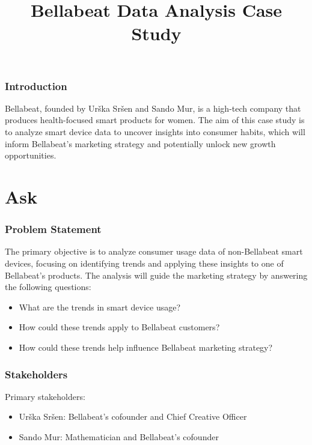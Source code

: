 \documentclass[
]{article}
\title{Bellabeat Data Analysis Case Study}
\author{}
\date{\vspace{-2.5em}}
\providecommand{\tightlist}{%
  \setlength{\itemsep}{0pt}\setlength{\parskip}{0pt}}
\begin{document}
\maketitle

\hypertarget{introduction}{%
\subsubsection{Introduction}\label{introduction}}

Bellabeat, founded by Urška Sršen and Sando Mur, is a high-tech company
that produces health-focused smart products for women. The aim of this
case study is to analyze smart device data to uncover insights into
consumer habits, which will inform Bellabeat's marketing strategy and
potentially unlock new growth opportunities.

\hypertarget{ask}{%
\section{Ask}\label{ask}}

\hypertarget{problem-statement}{%
\subsubsection{Problem Statement}\label{problem-statement}}

The primary objective is to analyze consumer usage data of non-Bellabeat
smart devices, focusing on identifying trends and applying these
insights to one of Bellabeat's products. The analysis will guide the
marketing strategy by answering the following questions:

\begin{itemize}
\tightlist
\item
  What are the trends in smart device usage?
\item
  How could these trends apply to Bellabeat customers?
\item
  How could these trends help influence Bellabeat marketing strategy?
\end{itemize}

\hypertarget{stakeholders}{%
\subsubsection{Stakeholders}\label{stakeholders}}

Primary stakeholders:

\begin{itemize}
\tightlist
\item
  Urška Sršen: Bellabeat's cofounder and Chief Creative Officer
\item
  Sando Mur: Mathematician and Bellabeat's cofounder
\end{itemize}
\end{document}
